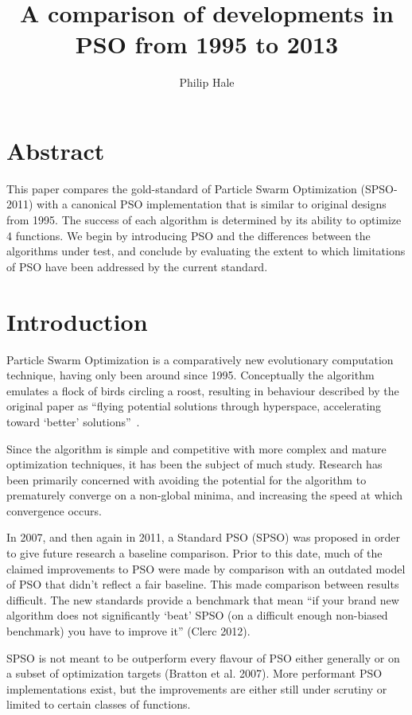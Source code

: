 \documentclass{csfourzero}
\author{Philip Hale}
\title{A comparison of developments in PSO from 1995 to 2013}
\begin{document}
\maketitle

\section{Abstract}

This paper compares the gold-standard of Particle Swarm Optimization
(SPSO-2011) with a canonical PSO implementation that is similar to original
designs from 1995. The success of each algorithm is determined by its ability
to optimize 4 functions. We begin by introducing PSO and the differences
between the algorithms under test, and conclude by evaluating the extent to
which limitations of PSO have been addressed by the current standard.

\section{Introduction}

Particle Swarm Optimization is a comparatively new evolutionary computation
technique, having only been around since 1995.  Conceptually the algorithm
emulates a flock of birds circling a roost, resulting in  behaviour described
by the original paper as ``flying potential solutions through hyperspace,
accelerating toward `better' solutions''~\cite{Kennedy:1995bi}.

Since the algorithm is simple and competitive with more complex and mature
optimization techniques, it has been the subject of much study. Research has
been primarily concerned with avoiding the potential for the algorithm to
prematurely converge on a non-global minima, and increasing the speed at which
convergence occurs.

In 2007, and then again in 2011, a Standard PSO (SPSO) was proposed in order to
give future research a baseline comparison. Prior to this date, much of the
claimed improvements to PSO were made by comparison with an outdated model of
PSO that didn't reflect a fair baseline. This made comparison between results
difficult. The new standards provide a benchmark that mean  ``if your brand new
algorithm does not significantly `beat' SPSO (on a difficult enough non-biased
benchmark) you have to improve it'' (Clerc 2012).

SPSO is not meant to be outperform every flavour of PSO either generally or on
a subset of optimization targets (Bratton et al. 2007). More performant PSO
implementations exist, but the improvements are either still under scrutiny or
limited to certain classes of functions.
\end{document}
